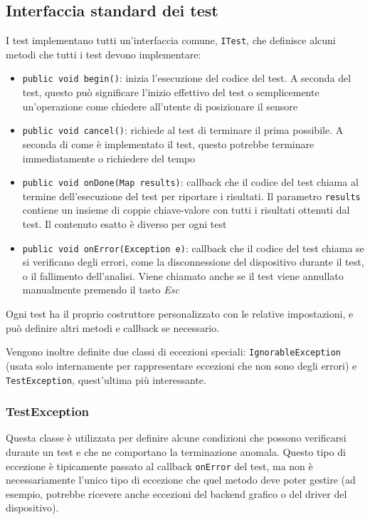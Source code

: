 \subsection{Interfaccia standard dei test}
I test implementano tutti un'interfaccia comune, \texttt{ITest}, che definisce alcuni metodi che tutti i test devono implementare:
\begin{itemize}
	\item \texttt{public void begin()}: inizia l'esecuzione del codice del test. A seconda del test, questo può significare l'inizio effettivo del test o semplicemente un'operazione come chiedere all'utente di posizionare il sensore
	\item \texttt{public void cancel()}: richiede al test di terminare il prima possibile. A seconda di come è implementato il test, questo potrebbe terminare immediatamente o richiedere del tempo
	\item \texttt{public void onDone(Map results)}: callback che il codice del test chiama al termine dell'esecuzione del test per riportare i risultati. Il parametro \texttt{results} contiene un insieme di coppie chiave-valore con tutti i risultati ottenuti dal test. Il contenuto esatto è diverso per ogni test
	\item \texttt{public void onError(Exception e)}: callback che il codice del test chiama se si verificano degli errori, come la disconnessione del dispositivo durante il test, o il fallimento dell'analisi. Viene chiamato anche se il test viene annullato manualmente premendo il tasto \textit{Esc}
\end{itemize}

Ogni test ha il proprio costruttore personalizzato con le relative impostazioni, e può definire altri metodi e callback se necessario.

Vengono inoltre definite due classi di eccezioni speciali: \texttt{IgnorableException} (usata solo internamente per rappresentare eccezioni che non sono degli errori) e \texttt{TestException}, quest'ultima più interessante.

\subsubsection{TestException}
Questa classe è utilizzata per definire alcune condizioni che possono verificarsi durante un test e che ne comportano la terminazione anomala. Questo tipo di eccezione è tipicamente passato al callback \texttt{onError} del test, ma non è necessariamente l'unico tipo di eccezione che quel metodo deve poter gestire (ad esempio, potrebbe ricevere anche eccezioni del backend grafico o del driver del dispositivo).

